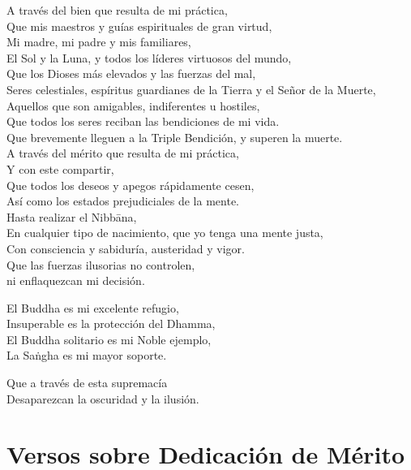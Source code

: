 A través del bien que resulta de mi práctica,\\
Que mis maestros y guías espirituales de gran virtud,\\
Mi madre, mi padre y mis familiares,\\
El Sol y la Luna, y todos los líderes virtuosos del mundo,\\
Que los Dioses más elevados y las fuerzas del mal,\\
Seres celestiales, espíritus guardianes de la Tierra y el Señor de la Muerte,\\
Aquellos que son amigables, indiferentes u hostiles,\\
Que todos los seres reciban las bendiciones de mi vida.\\
Que brevemente lleguen a la Triple Bendición, y superen la muerte.\\
A través del mérito que resulta de mi práctica,\\
Y con este compartir,\\
Que todos los deseos y apegos rápidamente cesen,\\
Así como los estados prejudiciales de la mente.\\
Hasta realizar el Nibbāna,\\
En cualquier tipo de nacimiento, que yo tenga una mente justa,\\
Con consciencia y sabiduría, austeridad y vigor.\\
Que las fuerzas ilusorias no controlen,\\
ni enflaquezcan mi decisión.

El Buddha es mi excelente refugio,\\
Insuperable es la protección del Dhamma,\\
El Buddha solitario es mi Noble ejemplo,\\
La Saṅgha es mi mayor soporte.

Que a través de esta supremacía\\
Desaparezcan la oscuridad y la ilusión.

\chapter[Dedicación de Mérito]{Versos sobre Dedicación de Mérito}


\begin{leader}
\end{leader}

